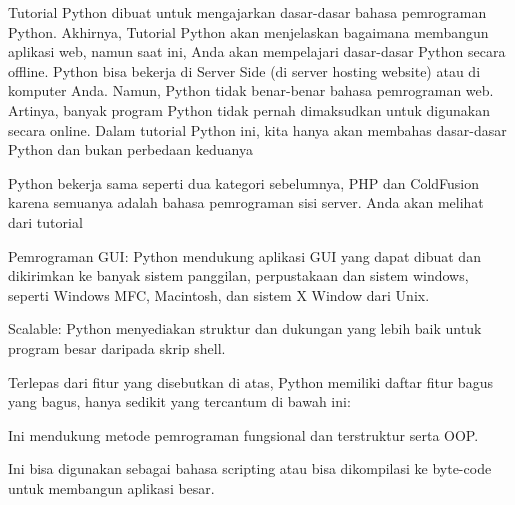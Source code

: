 \vspace{14pt}
\noindent 
{\fontsize{14pt}{14pt}\selectfont Tutorial Python dibuat untuk mengajarkan dasar-dasar bahasa pemrograman Python. Akhirnya, Tutorial Python akan menjelaskan bagaimana membangun aplikasi web, namun saat ini, Anda akan mempelajari dasar-dasar Python secara offline. Python bisa bekerja di Server Side (di server hosting website) atau di komputer Anda. Namun, Python tidak benar-benar bahasa pemrograman web. Artinya, banyak program Python tidak pernah dimaksudkan untuk digunakan secara online. Dalam tutorial Python ini, kita hanya akan membahas dasar-dasar Python dan bukan perbedaan keduanya \\} \par
\vspace{14pt}
\noindent 
{\fontsize{14pt}{14pt}\selectfont Python bekerja sama seperti dua kategori sebelumnya, PHP dan ColdFusion karena semuanya adalah bahasa pemrograman sisi server. Anda akan melihat dari tutorial \\} \par
\noindent 
{\fontsize{14pt}{14pt}\selectfont Pemrograman GUI: Python mendukung aplikasi GUI yang dapat dibuat dan dikirimkan ke banyak sistem panggilan, perpustakaan dan sistem windows, seperti Windows MFC, Macintosh, dan sistem X Window dari Unix. \\} \par
\vspace{14pt}
\noindent 
{\fontsize{14pt}{14pt}\selectfont Scalable: Python menyediakan struktur dan dukungan yang lebih baik untuk program besar daripada skrip shell. \\} \par
\vspace{14pt}
\noindent 
{\fontsize{14pt}{14pt}\selectfont Terlepas dari fitur yang disebutkan di atas, Python memiliki daftar fitur bagus yang bagus, hanya sedikit yang tercantum di bawah ini: \\} \par
\vspace{14pt}
\noindent 
{\fontsize{14pt}{14pt}\selectfont Ini mendukung metode pemrograman fungsional dan terstruktur serta OOP. \\} \par
\vspace{14pt}
\noindent 
{\fontsize{14pt}{14pt}\selectfont Ini bisa digunakan sebagai bahasa scripting atau bisa dikompilasi ke byte-code untuk membangun aplikasi besar. \\} \par
